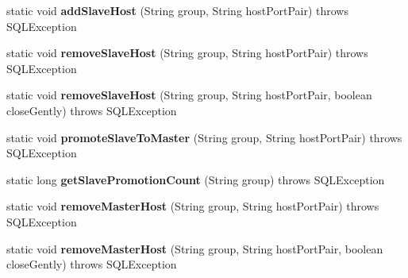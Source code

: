 \begin{DoxyCompactItemize}
static void {\bfseries add\+Slave\+Host} (String group, String host\+Port\+Pair)  throws S\+Q\+L\+Exception 
\item 
\mbox{\label{classcom_1_1mysql_1_1jdbc_1_1_replication_connection_group_manager_a292bfa9997251bce355a8ce565d7b1db}} 
static void {\bfseries remove\+Slave\+Host} (String group, String host\+Port\+Pair)  throws S\+Q\+L\+Exception 
\item 
\mbox{\label{classcom_1_1mysql_1_1jdbc_1_1_replication_connection_group_manager_a3b04521d2a431b33d089ab135038f0e0}} 
static void {\bfseries remove\+Slave\+Host} (String group, String host\+Port\+Pair, boolean close\+Gently)  throws S\+Q\+L\+Exception 
\item 
\mbox{\label{classcom_1_1mysql_1_1jdbc_1_1_replication_connection_group_manager_a5f271528d78e0a0c04f7dfe483d40da7}} 
static void {\bfseries promote\+Slave\+To\+Master} (String group, String host\+Port\+Pair)  throws S\+Q\+L\+Exception 
\item 
\mbox{\label{classcom_1_1mysql_1_1jdbc_1_1_replication_connection_group_manager_a70baec92cc982c5fdc96dc98ad29e9c4}} 
static long {\bfseries get\+Slave\+Promotion\+Count} (String group)  throws S\+Q\+L\+Exception 
\item 
\mbox{\label{classcom_1_1mysql_1_1jdbc_1_1_replication_connection_group_manager_afc94383ad5113d8e1c0f59b3ee558c04}} 
static void {\bfseries remove\+Master\+Host} (String group, String host\+Port\+Pair)  throws S\+Q\+L\+Exception 
\item 
\mbox{\label{classcom_1_1mysql_1_1jdbc_1_1_replication_connection_group_manager_abf340b01742eab810e8f104f49aef3e9}} 
static void {\bfseries remove\+Master\+Host} (String group, String host\+Port\+Pair, boolean close\+Gently)  throws S\+Q\+L\+Exception 
\item 
\mbox{\label{classcom_1_1mysql_1_1jdbc_1_1_replication_connection_group_manager_a6696e40ade6ac1c0634f8975441cb536}} 

\end{DoxyCompactItemize}
